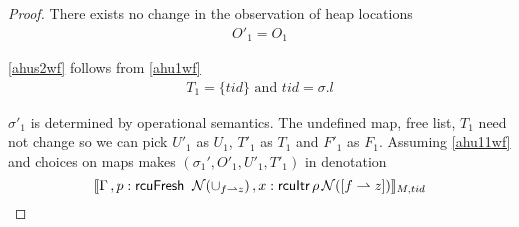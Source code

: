 \begin{proof}
There exists no change in the observation of heap locations
\begin{gather}\label{ahus1wf}
O'_1 =  O_1
\end{gather}

\ref{ahus2wf} follows from \ref{ahu1wf}
\begin{gather}\label{ahus2wf}
  T_1 = \{tid\} \text{ and } tid = \sigma.l
\end{gather}

$\sigma'_1$ is determined by operational semantics. The undefined map, free list, $T_1$ need not change so we can pick $U'_1$ as $U_1$, $T'_1$ as $T_1$ and $F'_1$ as $F_1$. Assuming \ref{ahu11wf} and choices on maps makes $(\sigma_1',O'_{1},U'_{1}, T'_{1})$ in denotation
\[\llbracket \Gamma \,, p : \textsf{rcuFresh} \;\; \mathcal{N}(\cup_{ f \rightharpoonup z}) \, , x:\textsf{rcuItr}\, \rho \, \mathcal{N}([f\rightharpoonup z]) \rrbracket_{M,tid}\]


\end{proof}
